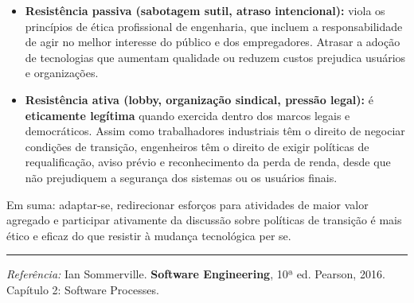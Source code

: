 \documentclass[12pt,a4paper]{article}
\begin{document}
\begin{resposta}
\begin{itemize}
  \item \textbf{Resistência passiva (sabotagem sutil, atraso intencional):}
        viola os princípios de ética profissional de engenharia, que incluem
        a responsabilidade de agir no melhor interesse do público e dos
        empregadores. Atrasar a adoção de tecnologias que aumentam qualidade
        ou reduzem custos prejudica usuários e organizações.

  \item \textbf{Resistência ativa (lobby, organização sindical, pressão legal):}
        é \textbf{eticamente legítima} quando exercida dentro dos marcos legais
        e democráticos. Assim como trabalhadores industriais têm o direito de
        negociar condições de transição, engenheiros têm o direito de exigir
        políticas de requalificação, aviso prévio e reconhecimento da perda
        de renda, desde que não prejudiquem a segurança dos sistemas ou os
        usuários finais.
\end{itemize}

Em suma: adaptar-se, redirecionar esforços para atividades de maior valor
agregado e participar ativamente da discussão sobre políticas de transição
é mais ético e eficaz do que resistir à mudança tecnológica per se.

\end{resposta}

\vspace{10pt}\hrule\vspace{8pt}
\begin{center}
{\small \textit{Referência:} Ian Sommerville.
\textbf{Software Engineering}, 10ª ed. Pearson, 2016. Capítulo 2:
Software Processes.}
\end{center}
\end{document}
